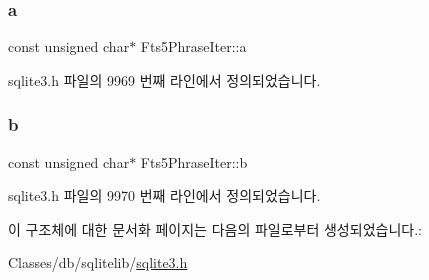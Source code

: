 \subsubsection{\texorpdfstring{a}{a}}
{\footnotesize\ttfamily const unsigned char$\ast$ Fts5\+Phrase\+Iter\+::a}



sqlite3.\+h 파일의 9969 번째 라인에서 정의되었습니다.

\mbox{\label{struct_fts5_phrase_iter_a459180b0d670604aa38b3ac94be6adda}} 
\subsubsection{\texorpdfstring{b}{b}}
{\footnotesize\ttfamily const unsigned char$\ast$ Fts5\+Phrase\+Iter\+::b}



sqlite3.\+h 파일의 9970 번째 라인에서 정의되었습니다.



이 구조체에 대한 문서화 페이지는 다음의 파일로부터 생성되었습니다.\+:\begin{DoxyCompactItemize}
\item 
Classes/db/sqlitelib/\hyperlink{sqlite3_8h}{sqlite3.\+h}\end{DoxyCompactItemize}
